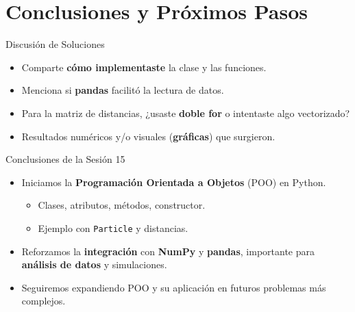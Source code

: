 \documentclass[10pt]{beamer}
\begin{document}
\section{Conclusiones y Próximos Pasos}

\begin{frame}{Discusión de Soluciones}
  \begin{itemize}
    \item Comparte \textbf{cómo implementaste} la clase y las funciones.
    \item Menciona si \textbf{pandas} facilitó la lectura de datos.
    \item Para la matriz de distancias, ¿usaste \textbf{doble for} o intentaste algo vectorizado?
    \item Resultados numéricos y/o visuales (\textbf{gráficas}) que surgieron.
  \end{itemize}
\end{frame}

\begin{frame}{Conclusiones de la Sesión 15}
  \begin{itemize}
    \item Iniciamos la \textbf{Programación Orientada a Objetos} (POO) en Python.
      \begin{itemize}
        \item Clases, atributos, métodos, constructor.
        \item Ejemplo con \texttt{Particle} y distancias.
      \end{itemize}
    \item Reforzamos la \textbf{integración} con \textbf{NumPy} y \textbf{pandas}, importante para \textbf{análisis de datos} y simulaciones.
    \item Seguiremos expandiendo POO y su aplicación en futuros problemas más complejos.
  \end{itemize}
\end{frame}
\end{document}
